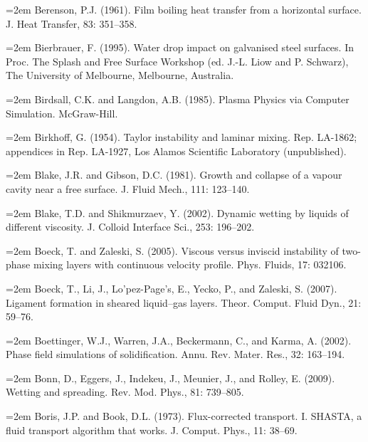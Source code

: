 \documentclass[11pt,a4paper,openany,fontset=none]{ctexbook}
\begin{document}
\par\hangindent=2em Berenson, P.J. (1961). Film boiling heat transfer from a horizontal surface. J. Heat Transfer, 83: 351--358.

\par\hangindent=2em Bierbrauer, F. (1995). Water drop impact on galvanised steel surfaces. In Proc. The Splash and Free Surface Workshop (ed. J.-L. Liow and P. Schwarz), The University of Melbourne, Melbourne, Australia.

\par\hangindent=2em Birdsall, C.K. and Langdon, A.B. (1985). Plasma Physics via Computer Simulation. McGraw-Hill.

\par\hangindent=2em Birkhoff, G. (1954). Taylor instability and laminar mixing. Rep. LA-1862; appendices in Rep. LA-1927, Los Alamos Scientific Laboratory (unpublished).

\par\hangindent=2em Blake, J.R. and Gibson, D.C. (1981). Growth and collapse of a vapour cavity near a free surface. J. Fluid Mech., 111: 123--140.

\par\hangindent=2em Blake, T.D. and Shikmurzaev, Y. (2002). Dynamic wetting by liquids of different viscosity. J. Colloid Interface Sci., 253: 196--202.

\par\hangindent=2em Boeck, T. and Zaleski, S. (2005). Viscous versus inviscid instability of two-phase mixing layers with continuous velocity profile. Phys. Fluids, 17: 032106.

\par\hangindent=2em Boeck, T., Li, J., Lo'pez-Page's, E., Yecko, P., and Zaleski, S. (2007). Ligament formation in sheared liquid--gas layers. Theor. Comput. Fluid Dyn., 21: 59--76.

\par\hangindent=2em Boettinger, W.J., Warren, J.A., Beckermann, C., and Karma, A. (2002). Phase field simulations of solidification. Annu. Rev. Mater. Res., 32: 163--194.

\par\hangindent=2em Bonn, D., Eggers, J., Indekeu, J., Meunier, J., and Rolley, E. (2009). Wetting and spreading. Rev. Mod. Phys., 81: 739--805.

\par\hangindent=2em Boris, J.P. and Book, D.L. (1973). Flux-corrected transport. I. SHASTA, a fluid transport algorithm that works. J. Comput. Phys., 11: 38--69.
\end{document}
